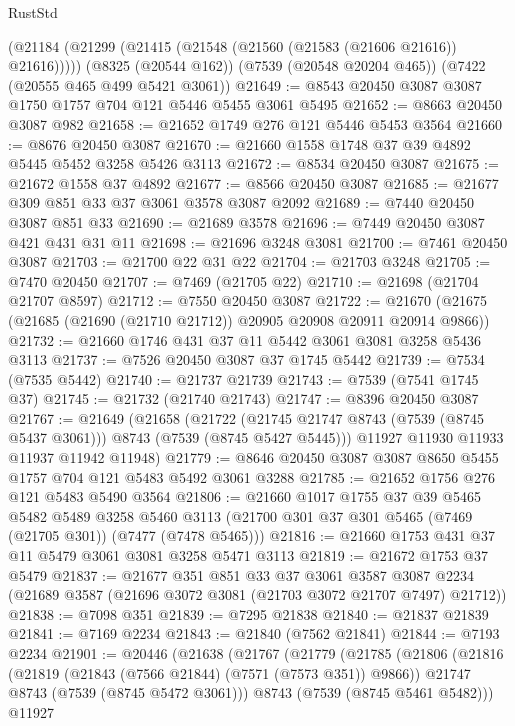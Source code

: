 \begin{lexlean}{RustStd}
\begin{coremodule}
    (@21184 (@21299 (@21415 (@21548 (@21560 (@21583 (@21606 @21616)) @21616)))))
    (@8325 (@20544 @162))
    (@7539 (@20548 @20204 @465))
    (@7422 (@20555 @465 @499 @5421 @3061))
@21649 := @8543 @20450 @3087 @3087 @1750 @1757 @704 @121 @5446 @5455 @3061 @5495
@21652 := @8663 @20450 @3087 @982
@21658 := @21652 @1749 @276 @121 @5446 @5453 @3564
@21660 := @8676 @20450 @3087
@21670 := @21660 @1558 @1748 @37 @39 @4892 @5445 @5452 @3258 @5426 @3113
@21672 := @8534 @20450 @3087
@21675 := @21672 @1558 @37 @4892
@21677 := @8566 @20450 @3087
@21685 := @21677 @309 @851 @33 @37 @3061 @3578 @3087 @2092
@21689 := @7440 @20450 @3087 @851 @33
@21690 := @21689 @3578
@21696 := @7449 @20450 @3087 @421 @431 @31 @11
@21698 := @21696 @3248 @3081
@21700 := @7461 @20450 @3087
@21703 := @21700 @22 @31 @22
@21704 := @21703 @3248
@21705 := @7470 @20450
@21707 := @7469 (@21705 @22)
@21710 := @21698 (@21704 @21707 @8597)
@21712 := @7550 @20450 @3087
@21722 := @21670 (@21675 (@21685 (@21690 (@21710 @21712)) @20905 @20908 @20911 @20914 @9866))
@21732 := @21660 @1746 @431 @37 @11 @5442 @3061 @3081 @3258 @5436 @3113
@21737 := @7526 @20450 @3087 @37 @1745 @5442
@21739 := @7534 (@7535 @5442)
@21740 := @21737 @21739
@21743 := @7539 (@7541 @1745 @37)
@21745 := @21732 (@21740 @21743)
@21747 := @8396 @20450 @3087
@21767 := @21649
    (@21658
      (@21722 (@21745 @21747 @8743 (@7539 (@8745 @5437 @3061))) @8743 (@7539 (@8745 @5427 @5445)))
      @11927
      @11930
      @11933
      @11937
      @11942
      @11948)
@21779 := @8646 @20450 @3087 @3087 @8650 @5455 @1757 @704 @121 @5483 @5492 @3061 @3288
@21785 := @21652 @1756 @276 @121 @5483 @5490 @3564
@21806 := @21660
    @1017
    @1755
    @37
    @39
    @5465
    @5482
    @5489
    @3258
    @5460
    @3113
    (@21700 @301 @37 @301 @5465 (@7469 (@21705 @301)) (@7477 (@7478 @5465)))
@21816 := @21660 @1753 @431 @37 @11 @5479 @3061 @3081 @3258 @5471 @3113
@21819 := @21672 @1753 @37 @5479
@21837 := @21677
    @351
    @851
    @33
    @37
    @3061
    @3587
    @3087
    @2234
    (@21689 @3587 (@21696 @3072 @3081 (@21703 @3072 @21707 @7497) @21712))
@21838 := @7098 @351
@21839 := @7295 @21838
@21840 := @21837 @21839
@21841 := @7169 @2234
@21843 := @21840 (@7562 @21841)
@21844 := @7193 @2234
@21901 := @20446
    (@21638
      (@21767
        (@21779
          (@21785
            (@21806
              (@21816
                (@21819 (@21843 (@7566 @21844) (@7571 (@7573 @351)) @9866))
                @21747
                @8743
                (@7539 (@8745 @5472 @3061)))
              @8743
              (@7539 (@8745 @5461 @5482)))
            @11927

\end{coremodule}
\end{lexlean}
